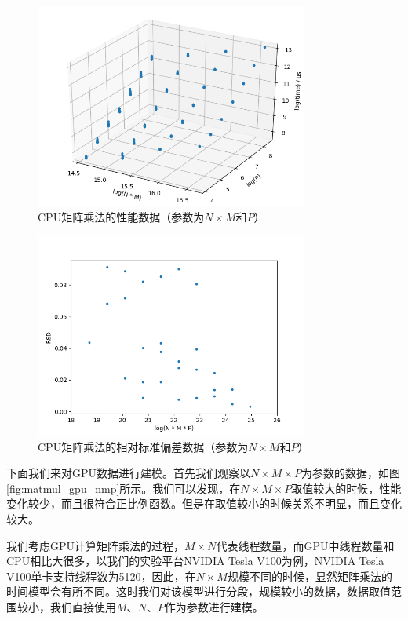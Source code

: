     \begin{figure}[!htbp]
        \centering
        \includegraphics[width=0.8\textwidth]{figures/matmul_cpu_nm_p.png}
        \caption{CPU矩阵乘法的性能数据（参数为$N \times M $和$ P $）}
        \label{fig:matmul_cpu_nm_p}
    \end{figure}

    \begin{figure}[!htbp]
        \centering
        \includegraphics[width=0.8\textwidth]{figures/matmul_cpu_nm_p_rsd.png}
        \caption{CPU矩阵乘法的相对标准偏差数据（参数为$ N \times M $和$ P $）}
        \label{fig:matmul_cpu_nm_p_rsd}
    \end{figure}

    下面我们来对GPU数据进行建模。首先我们观察以$ N \times M \times P $为参数的数据，如图\ref{fig:matmul_gpu_nmp}所示。我们可以发现，在$ N \times M \times P $取值较大的时候，性能变化较少，而且很符合正比例函数。但是在取值较小的时候关系不明显，而且变化较大。
    
    我们考虑GPU计算矩阵乘法的过程，$ M \times N $代表线程数量，而GPU中线程数量和CPU相比大很多，以我们的实验平台NVIDIA Tesla V100为例，NVIDIA Tesla V100单卡支持线程数为5120，因此，在$ N \times M$规模不同的时候，显然矩阵乘法的时间模型会有所不同。这时我们对该模型进行分段，规模较小的数据，数据取值范围较小，我们直接使用$ M $、$ N $、$ P $作为参数进行建模。
    
